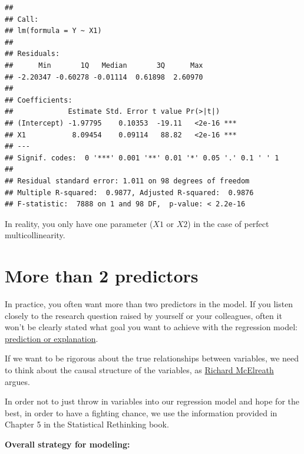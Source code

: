 \documentclass[
]{book}
\begin{document}
\begin{verbatim}
## 
## Call:
## lm(formula = Y ~ X1)
## 
## Residuals:
##      Min       1Q   Median       3Q      Max 
## -2.20347 -0.60278 -0.01114  0.61898  2.60970 
## 
## Coefficients:
##             Estimate Std. Error t value Pr(>|t|)    
## (Intercept) -1.97795    0.10353  -19.11   <2e-16 ***
## X1           8.09454    0.09114   88.82   <2e-16 ***
## ---
## Signif. codes:  0 '***' 0.001 '**' 0.01 '*' 0.05 '.' 0.1 ' ' 1
## 
## Residual standard error: 1.011 on 98 degrees of freedom
## Multiple R-squared:  0.9877, Adjusted R-squared:  0.9876 
## F-statistic:  7888 on 1 and 98 DF,  p-value: < 2.2e-16
\end{verbatim}

In reality, you only have one parameter (\(X1\) or \(X2\)) in the case of perfect multicollinearity.

\section{More than 2 predictors}\label{more-than-2-predictors}

In practice, you often want more than two predictors in the model.
If you listen closely to the research question raised by yourself or
your colleagues, often it won't be clearly stated what goal you want to achieve
with the regression model:
\href{https://projecteuclid.org/journals/statistical-science/volume-25/issue-3/To-Explain-or-to-Predict/10.1214/10-STS330.full}{prediction or explanation}.

If we want to be rigorous about the true relationships between variables,
we need to think about the causal structure of the variables,
as \href{https://www.youtube.com/watch?v=YvhuYONl1o0&ab_channel=KI-Campus}{Richard McElreath}
argues.

In order not to just throw in variables into our regression model and hope for the best,
in order to have a fighting chance, we use the information provided
in Chapter 5 in the Statistical Rethinking book.

\textbf{Overall strategy for modeling:}
\end{document}
